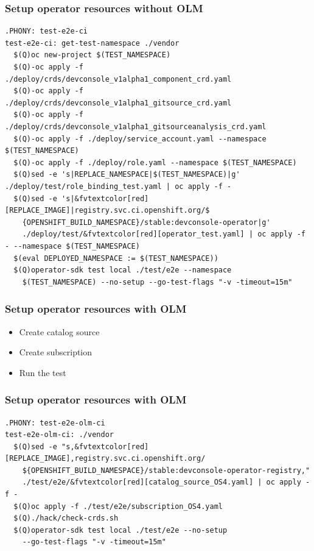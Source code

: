 \documentclass[aspectratio=169]{beamer}
\begin{document}
\begin{frame}[fragile]
  \frametitle{Setup operator resources without OLM}

  \begin{Verbatim}[fontsize=\small,commandchars=&\[\]]
.PHONY: test-e2e-ci
test-e2e-ci: get-test-namespace ./vendor
  $(Q)oc new-project $(TEST_NAMESPACE)
  $(Q)-oc apply -f ./deploy/crds/devconsole_v1alpha1_component_crd.yaml
  $(Q)-oc apply -f ./deploy/crds/devconsole_v1alpha1_gitsource_crd.yaml
  $(Q)-oc apply -f ./deploy/crds/devconsole_v1alpha1_gitsourceanalysis_crd.yaml
  $(Q)-oc apply -f ./deploy/service_account.yaml --namespace $(TEST_NAMESPACE)
  $(Q)-oc apply -f ./deploy/role.yaml --namespace $(TEST_NAMESPACE)
  $(Q)sed -e 's|REPLACE_NAMESPACE|$(TEST_NAMESPACE)|g' ./deploy/test/role_binding_test.yaml | oc apply -f -
  $(Q)sed -e 's|&fvtextcolor[red][REPLACE_IMAGE]|registry.svc.ci.openshift.org/$
    {OPENSHIFT_BUILD_NAMESPACE}/stable:devconsole-operator|g'
    ./deploy/test/&fvtextcolor[red][operator_test.yaml] | oc apply -f - --namespace $(TEST_NAMESPACE)
  $(eval DEPLOYED_NAMESPACE := $(TEST_NAMESPACE))
  $(Q)operator-sdk test local ./test/e2e --namespace
    $(TEST_NAMESPACE) --no-setup --go-test-flags "-v -timeout=15m"
  \end{Verbatim}
\end{frame}

\begin{frame}[fragile]
  \frametitle{Setup operator resources with OLM}
  \begin{itemize}
  \item Create catalog source
  \item Create subscription
  \item Run the test
  \end{itemize}
\end{frame}

\begin{frame}[fragile]
  \frametitle{Setup operator resources with OLM}

  \begin{Verbatim}[fontsize=\small,commandchars=&\[\]]
.PHONY: test-e2e-olm-ci
test-e2e-olm-ci: ./vendor
  $(Q)sed -e "s,&fvtextcolor[red][REPLACE_IMAGE],registry.svc.ci.openshift.org/
    ${OPENSHIFT_BUILD_NAMESPACE}/stable:devconsole-operator-registry,"
    ./test/e2e/&fvtextcolor[red][catalog_source_OS4.yaml] | oc apply -f -
  $(Q)oc apply -f ./test/e2e/subscription_OS4.yaml
  $(Q)./hack/check-crds.sh
  $(Q)operator-sdk test local ./test/e2e --no-setup
    --go-test-flags "-v -timeout=15m"
  \end{Verbatim}
\end{frame}
\end{document}
